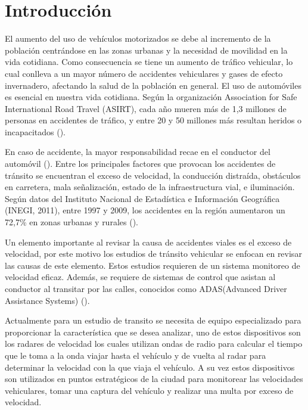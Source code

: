 \chapter{Introducción}

El aumento del uso de vehículos motorizados se debe al incremento de la población centrándose en las zonas urbanas y la necesidad de movilidad en la vida cotidiana. Como consecuencia se tiene un aumento de tráfico vehicular, lo cual conlleva a un mayor número de accidentes vehiculares y gases de efecto invernadero, afectando la salud de la población en general. El uso de automóviles es esencial en nuestra vida cotidiana. Según la organización Association for Safe International Road Travel (ASIRT), cada año mueren más de 1,3 millones de personas en accidentes de tráfico, y entre 20 y 50 millones más resultan heridos o incapacitados (\cite{zaki2020Traffic}).

En caso de accidente, la mayor responsabilidad recae en el conductor del automóvil (\cite{velazquez2017Siniestralidad}). Entre los principales factores que provocan los accidentes de tránsito se encuentran el exceso de velocidad, la conducción distraída, obstáculos en carretera, mala señalización, estado de la infraestructura vial, e iluminación. Según datos del Instituto Nacional de Estadística e Información Geográfica (INEGI, 2011), entre 1997 y 2009, los accidentes en la región aumentaron un 72,7\% en zonas urbanas y rurales (\cite{carro2019Conductas}).

Un elemento importante al revisar la causa de accidentes viales es el exceso de velocidad, por este motivo los estudios de tránsito vehicular se enfocan en revisar las causas de este elemento. Estos estudios requieren de un sistema monitoreo de velocidad eficaz. Además, se requiere de sistemas de control que asistan al conductor al transitar por las calles, conocidos como ADAS(Advanced Driver Assistance Systems) (\cite{carro2019Conductas}).

Actualmente para un estudio de transito se necesita de equipo especializado para proporcionar la característica que se desea analizar, uno de estos dispositivos son los radares de velocidad los cuales utilizan ondas de radio para calcular el tiempo que le toma a la onda viajar hasta el vehículo y de vuelta al radar para determinar la velocidad con la que viaja el vehículo. A su vez estos dispositivos son utilizados en puntos estratégicos de la ciudad para monitorear las velocidades vehiculares, tomar una captura del vehículo y realizar una multa por exceso de velocidad.

